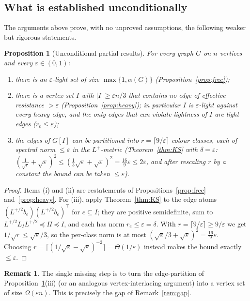\documentclass[12pt]{article}
\newtheorem{proposition}{Proposition}
\theoremstyle{definition}
\newtheorem{remark}{Remark}
\newcommand{\eps}{\varepsilon}
\begin{document}
\subsection*{What is established unconditionally}

The arguments above prove, with no unproved assumptions, the following weaker but rigorous statements.

\begin{proposition}[Unconditional partial results]\label{prop:uncond}
For every graph $G$ on $n$ vertices and every $\eps\in(0,1)$:
\begin{enumerate}
\item[\rm(i)] there is an $\eps$-light set of size $\max\{1,\alpha(G)\}$ (Proposition~\ref{prop:free});
\item[\rm(ii)] there is a vertex set $I$ with $|I|\ge\eps n/3$ that contains no edge of effective
resistance $>\eps$ (Proposition~\ref{prop:heavy}); in particular $I$ is $\eps$-light against every
heavy edge, and the only edges that can violate lightness of $I$ are light edges ($r_e\le\eps$);
\item[\rm(iii)] the edges of $G[I]$ can be partitioned into $r=\lceil 9/\eps\rceil$ colour classes,
each of spectral norm $\le\eps$ in the $L^{+}$-metric (Theorem~\ref{thm:KS} with $\delta=\eps$:
$(\tfrac1{\sqrt r}+\sqrt\eps)^2\le(\tfrac13\sqrt\eps+\sqrt\eps)^2=\tfrac{16}{9}\eps\le2\eps$, and after
rescaling $r$ by a constant the bound can be taken $\le\eps$).
\end{enumerate}
\end{proposition}
\begin{proof}
Items (i) and (ii) are restatements of Propositions~\ref{prop:free} and~\ref{prop:heavy}. For (iii),
apply Theorem~\ref{thm:KS} to the edge atoms $(L^{+/2}b_e)(L^{+/2}b_e)^\top$ for $e\subseteq I$; they
are positive semidefinite, sum to $L^{+/2}L_IL^{+/2}\preceq\Pi\preceq I$, and each has norm
$r_e\le\eps=\delta$. With $r=\lceil9/\eps\rceil\ge9/\eps$ we get $1/\sqrt r\le\sqrt\eps/3$, so the
per-class norm is at most $(\sqrt\eps/3+\sqrt\eps)^2=\tfrac{16}{9}\eps$. Choosing
$r=\lceil(1/\sqrt\eps-\sqrt\eps)^{-2}\rceil=\Theta(1/\eps)$ instead makes the bound exactly $\le\eps$.
\end{proof}

\begin{remark}
The single missing step is to turn the edge-partition of Proposition~\ref{prop:uncond}(iii) (or an
analogous vertex-interlacing argument) into a vertex set of size $\Omega(\eps n)$. This is precisely
the gap of Remark~\ref{rem:gap}.
\end{remark}
\end{document}
